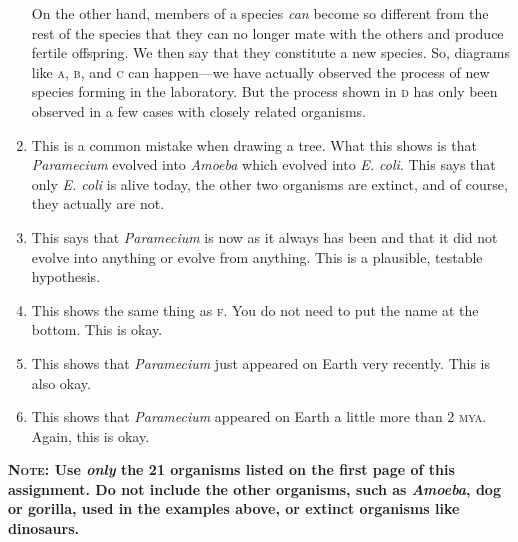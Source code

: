 \documentclass[12pt]{exam}
\begin{document}
\begin{enumerate}
On the other hand, members of a species \emph{can} become so different
from the rest of the species that they can no longer mate with the
others and produce fertile offspring. We then say that they constitute
a new species. So, diagrams like \textsc{a}, \textsc{b}, and \textsc{c} can happen—we have
actually observed the process of new species forming in the laboratory.
But the process shown in \textsc{d} has only been observed in a few cases with
closely related organisms.


\item
  This is a common mistake when drawing a tree. What this shows is that
  \emph{Paramecium} evolved into \emph{Amoeba} which evolved into
  \emph{E. coli}. This says that only \emph{E. coli} is alive today,
  the other two organisms are extinct, and of course, they actually
  are not.

\item
  This says that \emph{Paramecium} is now as it always has been and that
  it did not evolve into anything or evolve from anything. This is a
  plausible, testable hypothesis.

\item
  This shows the same thing as \textsc{f}. You do not need to put the name at the
  bottom. This is okay.

\item
  This shows that \emph{Paramecium} just appeared on Earth very
  recently. This is also okay.

\item
  This shows that \emph{Paramecium} appeared on Earth a little more than
  2 \textsc{mya}. Again, this is okay.

\end{enumerate}

\noindent\textbf{N\textsc{ote}: Use \emph{only} the 21 organisms listed on the first page
of this assignment. Do not include the other organisms, such as
\emph{Amoeba}, dog or gorilla, used in the examples above, or extinct organisms like dinosaurs.}
\end{document}
